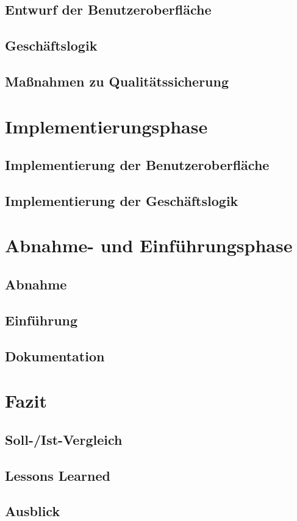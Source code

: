 \section{Entwurf der Benutzeroberfläche}

\section{Geschäftslogik}
\section{Maßnahmen zu Qualitätssicherung}

\chapter{Implementierungsphase}
\section{Implementierung der Benutzeroberfläche}
\section{Implementierung der Geschäftslogik}

\chapter{Abnahme- und Einführungsphase}

\section{Abnahme}
\section{Einführung}
\section{Dokumentation}

\chapter{Fazit}
\section{Soll-/Ist-Vergleich}
\section{Lessons Learned}
\section{Ausblick}
